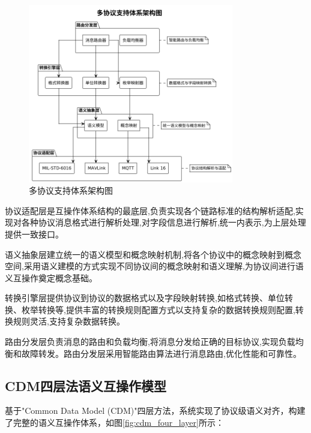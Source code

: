 \begin{figure}[H]
    \centering
    \includegraphics[width=0.8\textwidth]{chapters/fig-0/multi_protocol_support_simple.png}
    \caption{多协议支持体系架构图}
    \label{fig:multi_protocol_support}
\end{figure}

协议适配层是互操作体系结构的最底层,负责实现各个链路标准的结构解析适配,实现对各种协议消息格式进行解析处理,对字段信息进行解析,统一内表示,为上层处理提供一致接口。

语义抽象层建立统一的语义模型和概念映射机制,将各个协议中的概念映射到概念空间,采用语义建模的方式实现不同协议间的概念映射和语义理解,为协议间进行语义互操作奠定概念基础。

转换引擎层提供协议到协议的数据格式以及字段映射转换,如格式转换、单位转换、枚举转换等,提供丰富的转换规则配置方式以支持复杂的数据转换规则配置,转换规则灵活,支持复杂数据转换。

路由分发层负责消息的路由和负载均衡,将消息分发给正确的目标协议,实现负载均衡和故障转发。路由分发层采用智能路由算法进行消息路由,优化性能和可靠性。

\subsection{CDM四层法语义互操作模型}

基于"Common Data Model (CDM)"四层方法，系统实现了协议级语义对齐，构建了完整的语义互操作体系，如图\ref{fig:cdm_four_layer}所示：

